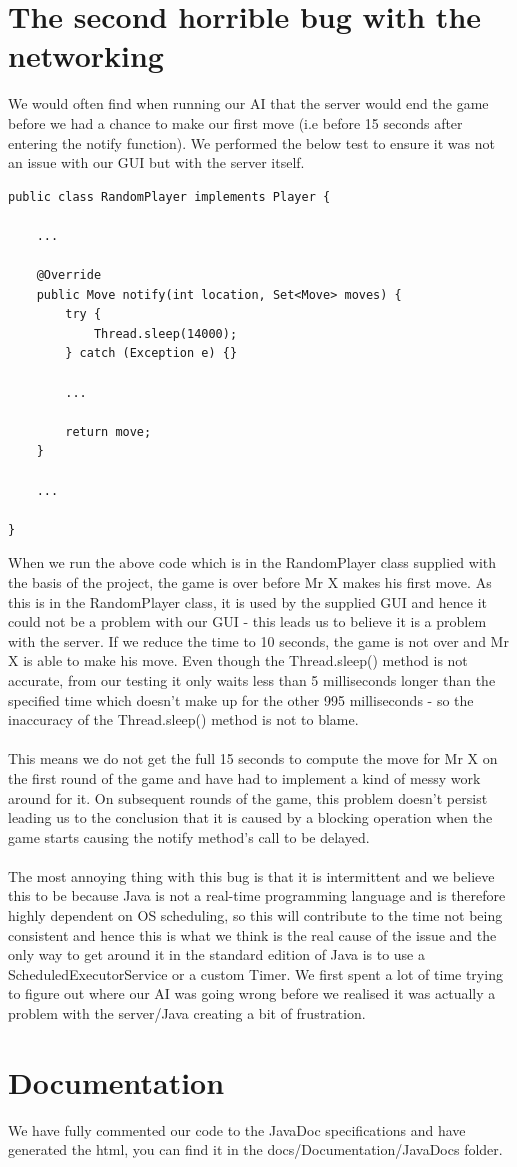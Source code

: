 \documentclass[a4paper, 12pt]{article}
\begin{document}
\section{The second horrible bug with the networking}
We would often find when running our AI that the server would end the game before we had a chance to make our first move (i.e before 15 seconds after entering the notify function). We performed the below test to ensure it was not an issue with our GUI but with the server itself.
\\
\begin{lstlisting}
public class RandomPlayer implements Player {

	...
	
	@Override
	public Move notify(int location, Set<Move> moves) {
		try {
			Thread.sleep(14000);
		} catch (Exception e) {}
		
		...
		
		return move;
	}
	
	...
	
}
\end{lstlisting}
\hfill \break
When we run the above code which is in the RandomPlayer class supplied with the basis of the project, the game is over before Mr X makes his first move. As this is in the RandomPlayer class, it is used by the supplied GUI and hence it could not be a problem with our GUI - this leads us to believe it is a problem with the server. If we reduce the time to 10 seconds, the game is not over and Mr X is able to make his move. Even though the Thread.sleep() method is not accurate, from our testing it only waits less than 5 milliseconds longer than the specified time which doesn't make up for the other 995 milliseconds - so the inaccuracy of the Thread.sleep() method is not to blame.
\\
\\
This means we do not get the full 15 seconds to compute the move for Mr X on the first round of the game and have had to implement a kind of messy work around for it. On subsequent rounds of the game, this problem doesn't persist leading us to the conclusion that it is caused by a blocking operation when the game starts causing the notify method's call to be delayed.
\\
\\
The most annoying thing with this bug is that it is intermittent and we believe this to be because Java is not a real-time programming language and is therefore highly dependent on OS scheduling, so this will contribute to the time not being consistent and hence this is what we think is the real cause of the issue and the only way to get around it in the standard edition of Java is to use a ScheduledExecutorService or a custom Timer.
We first spent a lot of time trying to figure out where our AI was going wrong before we realised it was actually a problem with the server/Java creating a bit of frustration.
\section{Documentation}
We have fully commented our code to the JavaDoc specifications and have generated the html, you can find it in the docs/Documentation/JavaDocs folder.
\end{document}
